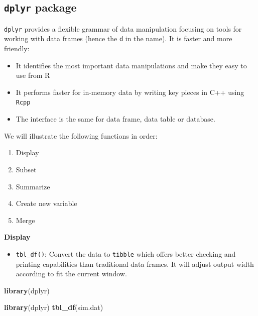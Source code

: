 \documentclass[12pt,]{krantz}
\makeatletter
\newenvironment{Shaded}{\begin{snugshade}}{\end{snugshade}}
\newcommand{\KeywordTok}[1]{\textcolor[rgb]{0.27,0.27,0.27}{\textbf{#1}}}
\newcommand{\NormalTok}[1]{#1}
\providecommand{\tightlist}{%
  \setlength{\itemsep}{0pt}\setlength{\parskip}{0pt}}
\newenvironment{kframe}{%
\medskip{}
\setlength{\fboxsep}{.8em}
 \def\at@end@of@kframe{}%
 \ifinner\ifhmode%
  \def\at@end@of@kframe{\end{minipage}}%
  \begin{minipage}{\columnwidth}%
 \fi\fi%
 \def\FrameCommand##1{\hskip\@totalleftmargin \hskip-\fboxsep
 \colorbox{shadecolor}{##1}\hskip-\fboxsep
     \hskip-\linewidth \hskip-\@totalleftmargin \hskip\columnwidth}%
 \MakeFramed {\advance\hsize-\width
   \@totalleftmargin\z@ \linewidth\hsize
   \@setminipage}}%
 {\par\unskip\endMakeFramed%
 \at@end@of@kframe}
\renewenvironment{Shaded}{\begin{kframe}}{\end{kframe}}
\theoremstyle{definition}
\theoremstyle{definition}
\theoremstyle{definition}
\theoremstyle{remark}
\makeatother
\begin{document}
\subsection{\texorpdfstring{\texttt{dplyr}
package}{dplyr package}}\label{dplyr-package}

\texttt{dplyr} provides a flexible grammar of data manipulation focusing
on tools for working with data frames (hence the \texttt{d} in the
name). It is faster and more friendly:

\begin{itemize}
\tightlist
\item
  It identifies the most important data manipulations and make they easy
  to use from R
\item
  It performs faster for in-memory data by writing key pieces in C++
  using \texttt{Rcpp}
\item
  The interface is the same for data frame, data table or database.
\end{itemize}

We will illustrate the following functions in order:

\begin{enumerate}
\def\labelenumi{\arabic{enumi}.}
\tightlist
\item
  Display
\item
  Subset
\item
  Summarize
\item
  Create new variable
\item
  Merge
\end{enumerate}

\textbf{Display}

\begin{itemize}
\tightlist
\item
  \texttt{tbl\_df()}: Convert the data to \texttt{tibble} which offers
  better checking and printing capabilities than traditional data
  frames. It will adjust output width according to fit the current
  window.
\end{itemize}

\begin{Shaded}
\begin{Highlighting}[]
\KeywordTok{library}\NormalTok{(dplyr)}
\end{Highlighting}
\end{Shaded}

\begin{Shaded}
\begin{Highlighting}[]
\KeywordTok{library}\NormalTok{(dplyr)}
\KeywordTok{tbl_df}\NormalTok{(sim.dat)}
\end{Highlighting}
\end{Shaded}
\end{document}
